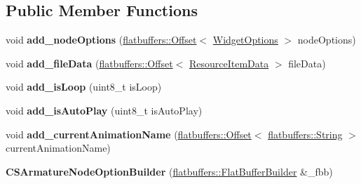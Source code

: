 \subsection*{Public Member Functions}
\begin{DoxyCompactItemize}
\item 
\mbox{\label{structflatbuffers_1_1CSArmatureNodeOptionBuilder_af1fa6d5bc75c338bd1af6d3884e035b1}} 
void {\bfseries add\+\_\+node\+Options} (\hyperlink{structflatbuffers_1_1Offset}{flatbuffers\+::\+Offset}$<$ \hyperlink{structflatbuffers_1_1WidgetOptions}{Widget\+Options} $>$ node\+Options)
\item 
\mbox{\label{structflatbuffers_1_1CSArmatureNodeOptionBuilder_a212ef17f30b12e77b3ff0a5a955c617e}} 
void {\bfseries add\+\_\+file\+Data} (\hyperlink{structflatbuffers_1_1Offset}{flatbuffers\+::\+Offset}$<$ \hyperlink{structflatbuffers_1_1ResourceItemData}{Resource\+Item\+Data} $>$ file\+Data)
\item 
\mbox{\label{structflatbuffers_1_1CSArmatureNodeOptionBuilder_a2bd096a75a9f76af1048f4ca5a5dea55}} 
void {\bfseries add\+\_\+is\+Loop} (uint8\+\_\+t is\+Loop)
\item 
\mbox{\label{structflatbuffers_1_1CSArmatureNodeOptionBuilder_a5fe58b65ae513d9301050d9d06549cdc}} 
void {\bfseries add\+\_\+is\+Auto\+Play} (uint8\+\_\+t is\+Auto\+Play)
\item 
\mbox{\label{structflatbuffers_1_1CSArmatureNodeOptionBuilder_acdd475b05ac3cba7a5e2d11c3ff4402a}} 
void {\bfseries add\+\_\+current\+Animation\+Name} (\hyperlink{structflatbuffers_1_1Offset}{flatbuffers\+::\+Offset}$<$ \hyperlink{structflatbuffers_1_1String}{flatbuffers\+::\+String} $>$ current\+Animation\+Name)
\item 
\mbox{\label{structflatbuffers_1_1CSArmatureNodeOptionBuilder_a1c7129d2801a3affada110106aaef876}} 
{\bfseries C\+S\+Armature\+Node\+Option\+Builder} (\hyperlink{classflatbuffers_1_1FlatBufferBuilder}{flatbuffers\+::\+Flat\+Buffer\+Builder} \&\+\_\+fbb)

\end{DoxyCompactItemize}
